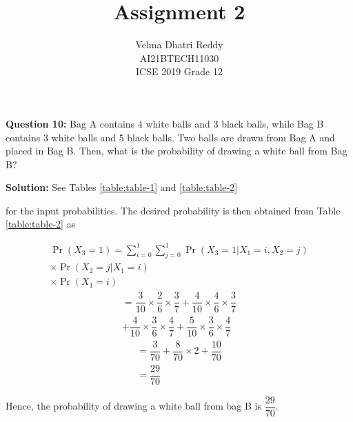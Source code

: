 \documentclass[journal,11pt,twocolumn]{IEEEtran}
\title{Assignment 2}
\author{Velma Dhatri Reddy \\ \normalsize AI21BTECH11030 \\ \vspace*{10pt} \Large ICSE 2019 Grade 12}
\providecommand{\pr}[1]{\ensuremath{\Pr\left(#1\right)}}
\begin{document}
\maketitle
\textbf{Question 10:}
Bag A contains 4 white balls and 3 black balls, while Bag B contains 3 white balls and 5 black balls. Two balls are drawn from Bag A and placed in Bag B. Then, what is the probability of drawing a white ball from Bag B?

\textbf{Solution:} See Tables 
	\eqref{table:table-1}
	and 
	\eqref{table:table-2} 
\begin{table}[ht!]
	
	\vspace*{5pt}
\caption{}
	\label{table:table-1}
\end{table}
\begin{table}[ht!]
	
	\vspace*{5pt}
\caption{}
	\label{table:table-2}
\end{table}
for the input probabilities.
The desired probability is then obtained from Table \eqref{table:table-2} as
	
\begin{multline}
    \pr{X_3 = 1} = \sum_{i=0}^{1}\sum_{j=0}^{1} \pr{X_3 = 1|X_1=i, X_2 = j }
    \\
    \times\pr{X_2 = j|X_1 = i}
    \\
    \times\pr{X_1 = i}
\end{multline}
\begin{multline}
    = \dfrac{3}{10}\times\dfrac{2}{6}\times\dfrac{3}{7} + \dfrac{4}{10}\times\dfrac{4}{6}\times\dfrac{3}{7}
    \\ 
    +\dfrac{4}{10}\times\dfrac{3}{6}\times\dfrac{4}{7}+  \dfrac{5}{10}\times\dfrac{3}{6}\times\dfrac{4}{7}
\end{multline}
\begin{align}
    &= \dfrac{3}{70} + \dfrac{8}{70}\times2 + \dfrac{10}{70} &
    \\
    &= \dfrac{29}{70} &
\end{align}

Hence, the probability of drawing a white ball from bag B is $\dfrac{29}{70}$.
\end{document}
